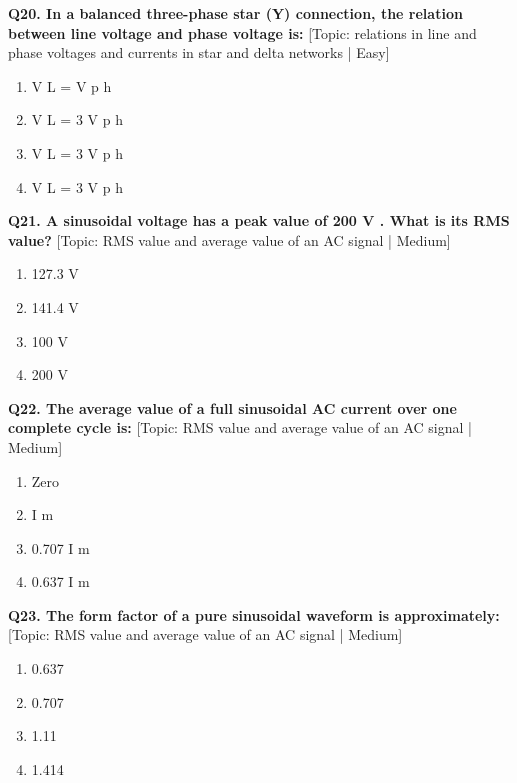 \noindent\textbf{Q20. In a balanced three-phase star (Y) connection, the relation between line voltage and phase voltage is:} \hfill [Topic: relations in line and phase voltages and currents in star and delta networks | Easy]
\begin{enumerate}[label=(\alph*),topsep=2pt,itemsep=1pt,partopsep=0pt,parsep=0pt]
    \item {V L = V p h}
    \item {V L = 3 V p h}
    \item {V L = 3 V p h}
    \item {V L = 3 V p h}
\end{enumerate}
\vspace{2mm}

\noindent\textbf{Q21. A sinusoidal voltage has a peak value of 200 V . What is its RMS value?} \hfill [Topic: RMS value and average value of an AC signal | Medium]
\begin{enumerate}[label=(\alph*),topsep=2pt,itemsep=1pt,partopsep=0pt,parsep=0pt]
    \item {127.3 V}
    \item {141.4 V}
    \item {100 V}
    \item {200 V}
\end{enumerate}
\vspace{2mm}

\noindent\textbf{Q22. The average value of a full sinusoidal AC current over one complete cycle is:} \hfill [Topic: RMS value and average value of an AC signal | Medium]
\begin{enumerate}[label=(\alph*),topsep=2pt,itemsep=1pt,partopsep=0pt,parsep=0pt]
    \item {Zero}
    \item {I m}
    \item {0.707 I m}
    \item {0.637 I m}
\end{enumerate}
\vspace{2mm}

\noindent\textbf{Q23. The form factor of a pure sinusoidal waveform is approximately:} \hfill [Topic: RMS value and average value of an AC signal | Medium]
\begin{enumerate}[label=(\alph*),topsep=2pt,itemsep=1pt,partopsep=0pt,parsep=0pt]
    \item {0.637}
    \item {0.707}
    \item {1.11}
    \item {1.414}
\end{enumerate}
\vspace{2mm}

